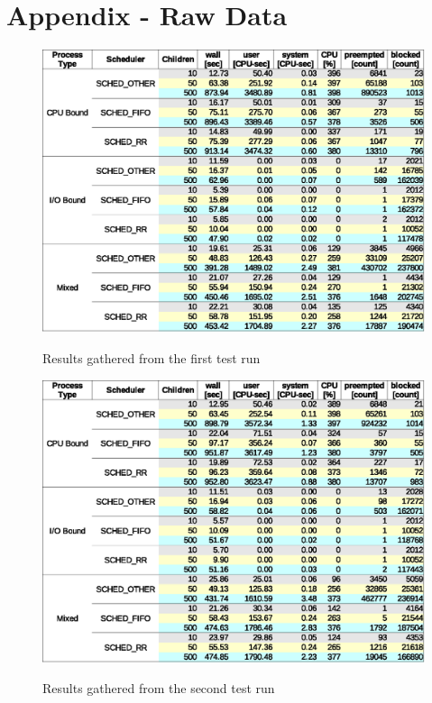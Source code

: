 ﻿\section{Appendix - Raw Data}

\begin{figure}[hbtp]
  \centering
  \caption{Results gathered from the first test run}
  \includegraphics[scale=1.0]{img/raw-results1-table.eps}
  \label{tab:raw-results1}
\end{figure}

\begin{figure}[hbtp]
  \centering
  \caption{Results gathered from the second test run}
  \includegraphics[scale=1.0]{img/raw-results2-table.eps}
  \label{tab:raw-results2}
\end{figure}


